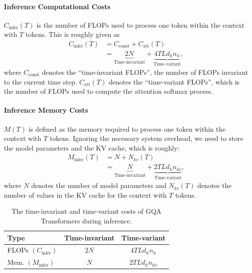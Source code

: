 \documentclass[11pt]{article}
\begin{document}
\paragraph{Inference Computational Costs}

$C_{\text{infer}}(T)$ is the number of FLOPs used to process one token within the context with $T$ tokens. This is roughly given as
\begin{equation}
\begin{aligned}
    \label{eq:inference-compute}
    C_{\text{infer}}(T) &= C_\text{const} + C_\text{att}(T) \\
    &= \underbrace{2N}_\text{Time-invariant} + \underbrace{4TL d_h n_h}_\text{Time-variant},
\end{aligned}
\end{equation}
where $C_\text{const}$ denotes the ``time-invariant FLOPs'', the number of FLOPs invariant to the current time step. $C_\text{att}(T)$ denotes the ``time-variant FLOPs'', which is the number of FLOPs used to compute the attention softmax process.

\paragraph{Inference Memory Costs}

$M(T)$ is defined as the memory required to process one token within the context with $T$ tokens. Ignoring the necessary system overhead, we need to store the model parameters and the KV cache, which is roughly:
\begin{equation}
\begin{aligned}
    \label{eq:inference-mem}
    M_{\text{infer}}(T)&=N+N_{kv}(T)\\
    &= \underbrace{N}_\text{Time-invariant} + \underbrace{2TLd_hn_{kv}}_\text{Time-variant},
\end{aligned}
\end{equation}
where $N$ denotes the number of model parameters and $N_{kv}(T)$ denotes the number of values in the KV cache for the context with $T$ tokens.


\begin{table}[t]
    \centering
    \footnotesize
    \begin{tabular}{l|cc}
        \toprule
            \textbf{Type}
            & \textbf{Time-invariant} 
            & \textbf{Time-variant}\\
        \midrule
        FLOPs $(C_\text{infer})$
            & $2N$ 
            & $4TLd_hn_{h}$  \\
        Mem. $(M_\text{infer})$  
            & $N$ 
            & $2TLd_hn_{kv}$ \\
        \bottomrule
    \end{tabular}
    \caption{The time-invariant and time-variant costs of GQA Transformers during inference.}
    \label{tab:inference-costs}
\end{table}
\end{document}
